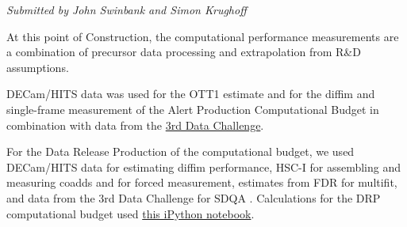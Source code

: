 \documentclass[DM,toc]{lsstdoc}
\begin{document}
\emph{Submitted by John Swinbank and Simon Krughoff}

At this point of Construction, the computational performance
measurements are a combination of precursor data processing and
extrapolation from R\&D assumptions.

DECam/HITS data was used for the OTT1 estimate and for the diffim and
single-frame measurement of the Alert Production Computational Budget in
combination with data from the
\href{https://dev.lsstcorp.org/trac/wiki/DC3bPT1_1}{3rd Data Challenge}.

For the Data Release Production of the computational budget, we used
DECam/HITS data for estimating diffim performance, HSC-I for assembling
and measuring coadds and for forced measurement, estimates from FDR for
multifit, and data from the 3rd Data Challenge for SDQA .
Calculations
for the DRP computational budget used
\href{https://github.com/lsst-dm/kpm/blob/29c053f7b832e8bd999527e012681826fc0c201c/DLP-314:\%20DRP\%20Computational\%20Budget/LSST\%20DRP\%20Computational\%20Budget.ipynb}{this
iPython notebook}.
\end{document}
